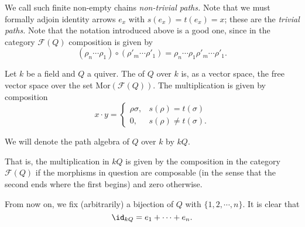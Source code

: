 \documentclass[main.tex]{subfiles}
\begin{document}
We call such finite non-empty chains \emph{non-trivial paths.} Note that we must formally adjoin identity arrows $e_{x}$ with $s(e_{x}) = t(e_{x}) = x$; these are the \emph{trivial paths.} Note that the notation introduced above is a good one, since in the category $\mathcal{F}(Q)$ composition is given by
\begin{equation*}
  (\rho_{n}\cdots \rho_{1}) \circ (\rho'_{m}\cdots \rho'_{1}) = \rho_{n}\cdots \rho_{1} \rho'_{m}\cdots \rho'_{1}.
\end{equation*}

\begin{definition}
  \label{def:path_algebra}
  Let $k$ be a field and $Q$ a quiver. The  of $Q$ over $k$ is, as a vector space, the free vector space over the set $\mathrm{Mor}(\mathcal{F}(Q))$. The multiplication is given by composition 
  \begin{equation*}
    x\cdot y =
    \begin{cases}
      \rho\sigma, & s(\rho) = t(\sigma) \\
      0, & s(\rho) \neq t(\sigma).
    \end{cases}
  \end{equation*}

  We will denote the path algebra of $Q$ over $k$ by $kQ$.

\end{definition}

That is, the multiplication in $kQ$ is given by the composition in the category $\mathcal{F}(Q)$ if the morphisms in question are composable (in the sense that the second ends where the first begins) and zero otherwise.

From now on, we fix (arbitrarily) a bijection of $Q$ with $\{1,2,\cdots,n\}$. It is clear that
\begin{equation*}
  \id_{kQ} = e_{1} + \cdots + e_{n}.
\end{equation*}
\end{document}
